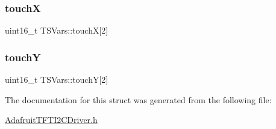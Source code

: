 \mbox{\label{struct_t_s_vars_ae0e46508cefc39da074adc673146ae15}} 
\subsubsection{\texorpdfstring{touchX}{touchX}}
{\footnotesize\ttfamily uint16\+\_\+t T\+S\+Vars\+::touchX\mbox{[}2\mbox{]}}

\mbox{\label{struct_t_s_vars_a08c99f4dc61958a48bf53f6ada6887da}} 
\subsubsection{\texorpdfstring{touchY}{touchY}}
{\footnotesize\ttfamily uint16\+\_\+t T\+S\+Vars\+::touchY\mbox{[}2\mbox{]}}



The documentation for this struct was generated from the following file\+:\begin{DoxyCompactItemize}
\item 
\mbox{\hyperlink{_adafruit_t_f_t_i2_c_driver_8h}{Adafruit\+T\+F\+T\+I2\+C\+Driver.\+h}}\end{DoxyCompactItemize}
